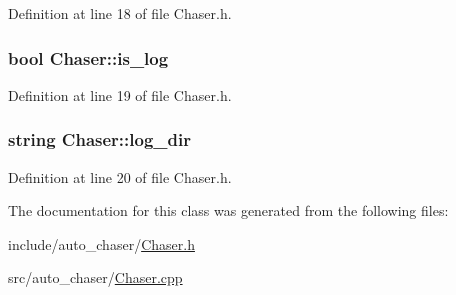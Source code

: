 Definition at line 18 of file Chaser.\+h.

\subsubsection[{\texorpdfstring{is\+\_\+log}{is_log}}]{\setlength{\rightskip}{0pt plus 5cm}bool Chaser\+::is\+\_\+log}\hypertarget{class_chaser_a33b880dd48d1d983001fa93ba1a1184f}{}\label{class_chaser_a33b880dd48d1d983001fa93ba1a1184f}


Definition at line 19 of file Chaser.\+h.

\subsubsection[{\texorpdfstring{log\+\_\+dir}{log_dir}}]{\setlength{\rightskip}{0pt plus 5cm}string Chaser\+::log\+\_\+dir}\hypertarget{class_chaser_a9d9ad4c7ca00bcda38d2bc809f3e7654}{}\label{class_chaser_a9d9ad4c7ca00bcda38d2bc809f3e7654}


Definition at line 20 of file Chaser.\+h.



The documentation for this class was generated from the following files\+:\begin{DoxyCompactItemize}
\item 
include/auto\+\_\+chaser/\hyperlink{_chaser_8h}{Chaser.\+h}\item 
src/auto\+\_\+chaser/\hyperlink{_chaser_8cpp}{Chaser.\+cpp}\end{DoxyCompactItemize}
